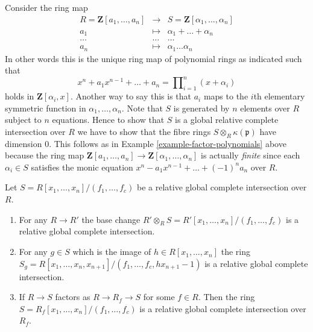 \begin{example}
\label{example-roots-universal-polynomial}
Consider the ring map
\begin{eqnarray*}
R = \mathbf{Z}[a_1, \ldots, a_n]
& \longrightarrow &
S = \mathbf{Z}[\alpha_1, \ldots, \alpha_n] \\
a_1 & \longmapsto &
\alpha_1 + \ldots + \alpha_n \\
\ldots & \ldots & \ldots \\
a_n & \longmapsto & \alpha_1 \ldots \alpha_n
\end{eqnarray*}
In other words this is the unique ring map of polynomial
rings as indicated
such that
$$
x^n + a_1 x^{n - 1} + \ldots + a_n
=
\prod\nolimits_{i = 1}^n (x + \alpha_i)
$$
holds in $\mathbf{Z}[\alpha_i, x]$. Another way to say this
is that $a_i$ maps to the $i$th elementary symmetric function
in $\alpha_1, \ldots, \alpha_n$. Note that $S$ is generated by
$n$ elements over $R$ subject to $n$ equations. Hence to show
that $S$ is a global relative complete intersection over
$R$ we have to show that the fibre rings $S \otimes_R \kappa(\mathfrak p)$
have dimension $0$. This follows as in
Example \ref{example-factor-polynomials} above because the ring map
$\mathbf{Z}[a_1, \ldots, a_n] \to
\mathbf{Z}[\alpha_1, \ldots, \alpha_n]$ is actually {\it finite}
since each $\alpha_i \in S$
satisfies the monic equation $x^n - a_1 x^{n - 1} + \ldots + (-1)^n a_n$
over $R$.
\end{example}

\begin{lemma}
\label{lemma-base-change-relative-global-complete-intersection}
Let $S = R[x_1, \ldots, x_n]/(f_1, \ldots, f_c)$ be a
relative global complete intersection over $R$.
\begin{enumerate}
\item For any $R \to R'$ the base change
$R' \otimes_R S = R'[x_1, \ldots, x_n]/(f_1, \ldots, f_c)$ is a relative
global complete intersection.
\item For any $g \in S$ which is the image of $h \in R[x_1, \ldots, x_n]$
the ring
$S_g = R[x_1, \ldots, x_n, x_{n + 1}]/(f_1, \ldots, f_c, hx_{n + 1} - 1)$
is a relative global complete intersection.
\item If $R \to S$ factors as $R \to R_f \to S$ for some $f \in R$.
Then the ring $S = R_f[x_1, \ldots, x_n]/(f_1, \ldots, f_c)$
is a relative global complete intersection over $R_f$.
\end{enumerate}
\end{lemma}

